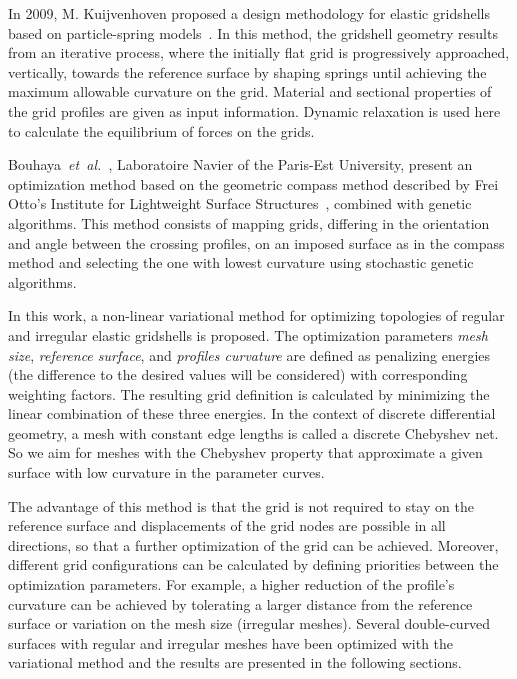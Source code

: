 \documentclass[Thesis.tex]{subfiles}
\begin{document}
In 2009, M. Kuijvenhoven proposed a design methodology for elastic gridshells based on particle-spring models~\cite{Kuijvenhoven2009}. In this method, the gridshell geometry results from an iterative process, where the initially flat grid is progressively approached, vertically, towards the reference surface by shaping springs until achieving the maximum allowable curvature on the grid. Material and sectional properties of the grid profiles are given as input information. Dynamic relaxation is used here to calculate the equilibrium of forces on the grids. 

Bouhaya~\emph{et~al.}~\cite{BouhayaBC2011}, Laboratoire Navier of the Paris-Est University, present an optimization method based on the geometric compass method described by Frei Otto's Institute for Lightweight Surface Structures~\cite{IL1974}, combined with genetic algorithms. This method consists of mapping grids, differing in the orientation and angle between the crossing profiles, on an imposed surface as in the compass method and selecting the one with lowest curvature using stochastic genetic algorithms.

In this work, a non-linear variational method for optimizing topologies of regular and irregular elastic gridshells is proposed. The optimization parameters {\it mesh size}, {\it reference surface}, and {\it profiles curvature} are defined as penalizing energies (the difference to the desired values will be considered) with corresponding weighting factors. The resulting grid definition is calculated by minimizing the linear combination of these three energies. In the context of discrete differential geometry, a mesh with constant edge lengths is called a discrete Chebyshev net. So we aim for meshes with the Chebyshev property that approximate a given surface with low curvature in the parameter curves. 

The advantage of this method is that the grid is not required to stay on the reference surface and displacements of the grid nodes are possible in all directions, so that a further optimization of the grid can be achieved. Moreover, different grid configurations can be calculated by defining priorities between the optimization parameters. For example, a higher reduction of the profile's curvature can be achieved by tolerating a larger distance from the reference surface or variation on the mesh size (irregular meshes). Several double-curved surfaces with regular and irregular meshes have been optimized with the variational method and the results are presented in the following sections.
\end{document}
